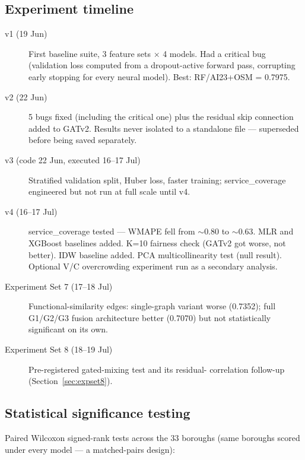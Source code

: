 \documentclass[11pt]{article}
\let\oldsubsection\subsection
\renewcommand{\subsection}[1]{\oldsubsection{\color{sectcolor}#1}}
\begin{document}
\subsection{Experiment timeline}
\begin{description}
\item[v1 (19 Jun)] First baseline suite, 3 feature sets $\times$ 4 models. Had a critical
bug (validation loss computed from a dropout-active forward pass, corrupting early
stopping for every neural model). Best: RF/AI23+OSM = 0.7975.
\item[v2 (22 Jun)] 5 bugs fixed (including the critical one) plus the residual skip
connection added to GATv2. Results never isolated to a standalone file --- superseded before
being saved separately.
\item[v3 (code 22 Jun, executed 16--17 Jul)] Stratified validation split, Huber loss, faster
training; service\_coverage engineered but not run at full scale until v4.
\item[v4 (16--17 Jul)] service\_coverage tested --- WMAPE fell from $\sim$0.80 to
$\sim$0.63. MLR and XGBoost baselines added. K=10 fairness check (GATv2 got worse, not
better). IDW baseline added. PCA multicollinearity test (null result). Optional V/C
overcrowding experiment run as a secondary analysis.
\item[Experiment Set 7 (17--18 Jul)] Functional-similarity edges: single-graph variant
worse (0.7352); full G1/G2/G3 fusion architecture better (0.7070) but not statistically
significant on its own.
\item[Experiment Set 8 (18--19 Jul)] Pre-registered gated-mixing test and its residual-
correlation follow-up (Section~\ref{sec:expset8}).
\end{description}

\subsection{Statistical significance testing}
Paired Wilcoxon signed-rank tests across the 33 boroughs (same boroughs scored under every
model --- a matched-pairs design):
\end{document}
